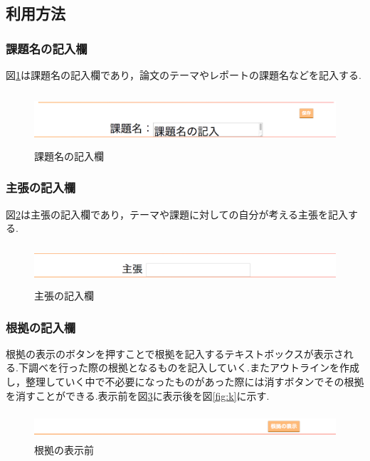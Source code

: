 \documentclass[a4j,12pt]{jarticle}
\begin{document}
\subsection{利用方法}
\subsubsection{課題名の記入欄}
図\ref{fig:h}は課題名の記入欄であり，論文のテーマやレポートの課題名などを記入する.
\begin{figure}[h]
\begin{center}
 \includegraphics[clip,width=150mm,height=20mm]{figure/00kadai.png}
\end{center}
 \caption{課題名の記入欄}
 \label{fig:h}
\end{figure}

\subsubsection{主張の記入欄}
図\ref{fig:i}は主張の記入欄であり，テーマや課題に対しての自分が考える主張を記入する.
\begin{figure}[h]
\begin{center}
 \includegraphics[clip,width=150mm,height=15mm]{figure/01shucho.png}
\end{center}
 \caption{主張の記入欄}
 \label{fig:i}
\end{figure}
\newpage
\subsubsection{根拠の記入欄}
根拠の表示のボタンを押すことで根拠を記入するテキストボックスが表示される.下調べを行った際の根拠となるものを記入していく.またアウトラインを作成し，整理していく中で不必要になったものがあった際には消すボタンでその根拠を消すことができる.表示前を図\ref{fig:j}に表示後を図\ref{fig:k}に示す.
\begin{figure}[h]
\begin{center}
 \includegraphics[clip,width=150mm,height=10mm]{figure/02konkyo.png}
\end{center}
 \caption{根拠の表示前}
 \label{fig:j}
\end{figure}
\end{document}
